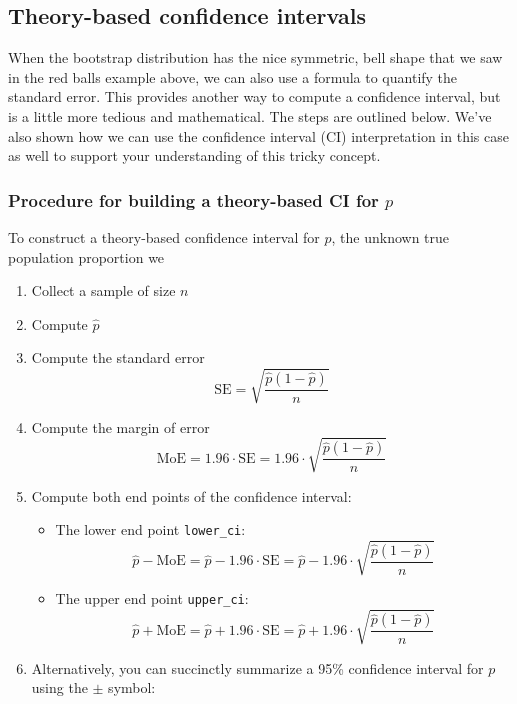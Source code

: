 \documentclass[12pt,]{krantz}
\providecommand{\tightlist}{%
  \setlength{\itemsep}{0pt}\setlength{\parskip}{0pt}}
\begin{document}
\subsection{Theory-based confidence
intervals}\label{theory-based-confidence-intervals}

When the bootstrap distribution has the nice symmetric, bell shape that
we saw in the red balls example above, we can also use a formula to
quantify the standard error. This provides another way to compute a
confidence interval, but is a little more tedious and mathematical. The
steps are outlined below. We've also shown how we can use the confidence
interval (CI) interpretation in this case as well to support your
understanding of this tricky concept.

\subsubsection*{\texorpdfstring{Procedure for building a theory-based CI
for
\(p\)}{Procedure for building a theory-based CI for p}}\label{procedure-for-building-a-theory-based-ci-for-p}

To construct a theory-based confidence interval for \(p\), the unknown
true population proportion we

\begin{enumerate}
\def\labelenumi{\arabic{enumi}.}
\tightlist
\item
  Collect a sample of size \(n\)
\item
  Compute \(\widehat{p}\)
\item
  Compute the standard error
  \[\text{SE} = \sqrt{\frac{\widehat{p}(1-\widehat{p})}{n}}\]
\item
  Compute the margin of error
  \[\text{MoE} = 1.96 \cdot \text{SE} =  1.96 \cdot \sqrt{\frac{\widehat{p}(1-\widehat{p})}{n}}\]
\item
  Compute both end points of the confidence interval:

  \begin{itemize}
  \tightlist
  \item
    The lower end point \texttt{lower\_ci}:
    \[\widehat{p} - \text{MoE} = \widehat{p} - 1.96 \cdot \text{SE} = \widehat{p} - 1.96 \cdot \sqrt{\frac{\widehat{p}(1-\widehat{p})}{n}}\]
  \item
    The upper end point \texttt{upper\_ci}:
    \[\widehat{p} + \text{MoE} = \widehat{p} + 1.96 \cdot \text{SE} = \widehat{p} + 1.96 \cdot \sqrt{\frac{\widehat{p}(1-\widehat{p})}{n}}\]
  \end{itemize}
\item
  Alternatively, you can succinctly summarize a 95\% confidence interval
  for \(p\) using the \(\pm\) symbol:
\end{enumerate}
\end{document}
